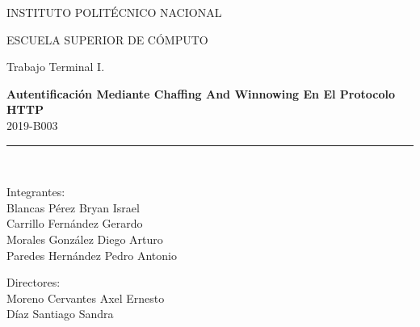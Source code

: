 \documentclass[12pt, a4paper, titlepage]{article}
\begin{document}
\begin{titlepage}
		\begin{center}
		\begin{LARGE}
			\textcolor{guindapoli}{INSTITUTO POLITÉCNICO NACIONAL}\\
		\end{LARGE}	
		\vspace*{0.2in}
		\begin{Large}
			\textcolor{azulescom}{ESCUELA SUPERIOR DE CÓMPUTO}\\
		\end{Large}		
		\vspace*{0.4in}
		\begin{large}
			Trabajo Terminal I.\\
		\end{large}
		\vspace*{0.2in}
		\begin{Large}
			\textbf{Autentificación Mediante Chaffing And Winnowing En El Protocolo HTTP}\\2019-B003\\
		\end{Large}
		\vspace*{0.05in}
		\rule{80mm}{0.1mm}\\
		\vspace*{0.1in}
		\begin{large}
			\begin{center}
				Integrantes:\\
				Blancas Pérez Bryan Israel\\
				Carrillo Fernández Gerardo\\
				Morales González Diego Arturo\\
				Paredes Hernández Pedro Antonio\\
			\end{center}
		\end{large}
		\begin{large}
			Directores:\\
			Moreno Cervantes Axel Ernesto\\
			Díaz Santiago Sandra\\
		\end{large}
		\end{center}
	\end{titlepage}

	\begin{appendix}
		\renewcommand*\contentsname{Índice}
		\tableofcontents
		\newpage
		\listoffigures
		\newpage
		\newpage
		\listoftables
	\end{appendix}
	\newpage
	
\end{document}
